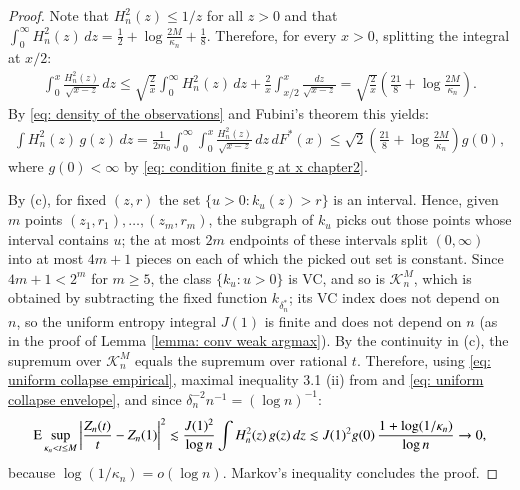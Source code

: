 \begin{proof}
Note that $H_n^2(z) \leq 1/z$ for all $z>0$ and that $\int_0^\infty H_n^2(z)\,dz = \frac{1}{2} + \log\frac{2M}{\kappa_n} + \frac{1}{8}$. Therefore, for every $x>0$, splitting the integral at $x/2$:
\begin{align*}
\int_0^x \frac{H_n^2(z)}{\sqrt{x-z}}\,dz \leq \sqrt{\frac{2}{x}}\int_0^\infty H_n^2(z)\,dz + \frac{2}{x}\int_{x/2}^x \frac{dz}{\sqrt{x-z}} = \sqrt{\frac{2}{x}}\left(\frac{21}{8} + \log\frac{2M}{\kappa_n}\right).
\end{align*}
By \eqref{eq: density of the observations} and Fubini's theorem this yields:
\begin{align}\label{eq: uniform collapse envelope}
\int H_n^2(z)\,g(z)\,dz = \frac{1}{2m_0}\int_0^\infty \int_0^x \frac{H_n^2(z)}{\sqrt{x-z}}\,dz\,dF^*(x) \leq \sqrt{2}\left(\frac{21}{8} + \log\frac{2M}{\kappa_n}\right) g(0),
\end{align}
where $g(0)<\infty$ by \eqref{eq: condition finite g at x chapter2}.

By (c), for fixed $(z,r)$ the set $\{u>0 : k_u(z) > r\}$ is an interval. Hence, given $m$ points $(z_1,r_1),\dots,(z_m,r_m)$, the subgraph of $k_u$ picks out those points whose interval contains $u$; the at most $2m$ endpoints of these intervals split $(0,\infty)$ into at most $4m+1$ pieces on each of which the picked out set is constant. Since $4m+1<2^m$ for $m \geq 5$, the class $\{k_u : u>0\}$ is VC, and so is $\mathscr{K}^M_n$, which is obtained by subtracting the fixed function $k_{\delta^*_n}$; its VC index does not depend on $n$, so the uniform entropy integral $J(1)$ is finite and does not depend on $n$ (as in the proof of Lemma \ref{lemma: conv weak argmax}). By the continuity in (c), the supremum over $\mathscr{K}^M_n$ equals the supremum over rational $t$. Therefore, using \eqref{eq: uniform collapse empirical}, maximal inequality 3.1 (ii) from \cite{12} and \eqref{eq: uniform collapse envelope}, and since $\delta_n^{-2} n^{-1} = (\log n)^{-1}$:
\begin{align*}
\mathrm{E} \sup_{\kappa_n < t \leq M}\left|\frac{Z_n(t)}{t}-Z_n(1)\right|^2 \lesssim \frac{J(1)^2}{\log n}\int H_n^2(z)\,g(z)\,dz \lesssim J(1)^2 g(0)\, \frac{1+\log(1/\kappa_n)}{\log n} \rightarrow 0,
\end{align*}
because $\log(1/\kappa_n) = o(\log n)$. Markov's inequality concludes the proof.
\end{proof}

